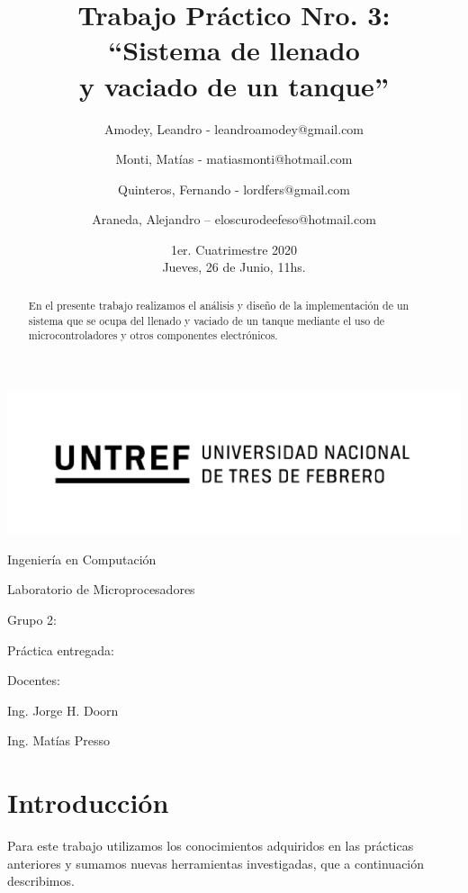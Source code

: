 ﻿\documentclass[a4paper]{article}
\title{Trabajo Práctico Nro. 3:\\``Sistema de llenado\\y vaciado de un tanque''}
\author{Amodey, Leandro - leandroamodey@gmail.com
\and Monti, Matías - matiasmonti@hotmail.com
\and Quinteros, Fernando - lordfers@gmail.com
\and Araneda, Alejandro – eloscurodeefeso@hotmail.com}
\date{1er. Cuatrimestre 2020\\Jueves, 26 de Junio, 11hs.}
\def\teacher{Ing. Jorge H. Doorn
\and Ing. Matías Presso}
\begin{document}
\begin{titlepage}\renewcommand\and\par\centering\makeatletter
    \includegraphics{logo.png}\par
    {\Large Ingeniería en Computación \par}\vspace{0.5cm}
    {\LARGE Laboratorio de Microprocesadores \par}\vfill
    {\huge \@title \par}\vfill
    Grupo 2:\par
    \@author\vfill
    Práctica entregada:\par
    \@date\vfill
    Docentes:\par
    \teacher\vspace{1cm}\makeatother
\end{titlepage}

\begin{abstract}

    En el presente trabajo realizamos el análisis y diseño de la
    implementación de un sistema que se ocupa del llenado y vaciado 
    de un tanque mediante el uso de microcontroladores y otros 
    componentes electrónicos.

\end{abstract}

\section{Introducción}

Para este trabajo utilizamos los conocimientos adquiridos en las 
prácticas anteriores y sumamos nuevas herramientas investigadas, 
que a continuación describimos.


\end{document}
